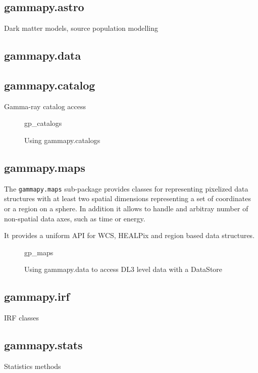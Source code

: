 \subsection{gammapy.astro}
\label{ssec:gammapy-astro}
Dark matter models, source population modelling

\subsection{gammapy.data}
\label{ssec:gammapy-data}

\subsection{gammapy.catalog}
\label{ssec:gammapy-catalog}
Gamma-ray catalog access

\begin{figure}
	{gp_catalogs}
	\caption{Using gammapy.catalogs}
	\label{codeexample:data}
\end{figure}

\subsection{gammapy.maps}
\label{ssec:gammapy-maps}
The \verb|gammapy.maps| sub-package provides classes for representing pixelized
data structures with at least two spatial dimensions representing a set of
coordinates or a region on a sphere. In addition it allows to handle and
arbitray  number of non-spatial data axes, such as time or energy.

It provides a uniform API for WCS, HEALPix and region based data structures.

\begin{figure}
	{gp_maps}
	\caption{Using gammapy.data to access DL3 level data with a DataStore}
	\label{codeexample:data}
\end{figure}

\subsection{gammapy.irf}
\label{ssec:gammapy-irf}
IRF classes

\subsection{gammapy.stats}
\label{ssec:gammapy-stats}
Statistics methods


